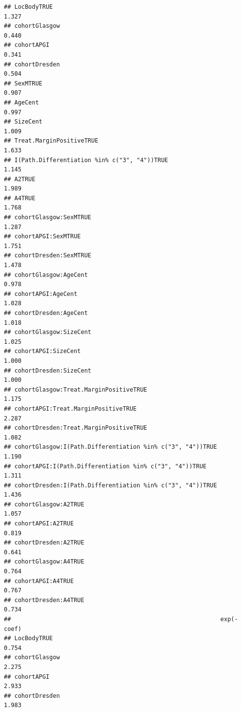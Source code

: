 \documentclass{article}\usepackage[]{graphicx}\usepackage[]{color}
\makeatletter
\newenvironment{kframe}{%
 \def\at@end@of@kframe{}%
 \ifinner\ifhmode%
  \def\at@end@of@kframe{\end{minipage}}%
  \begin{minipage}{\columnwidth}%
 \fi\fi%
 \def\FrameCommand##1{\hskip\@totalleftmargin \hskip-\fboxsep
 \colorbox{shadecolor}{##1}\hskip-\fboxsep
     \hskip-\linewidth \hskip-\@totalleftmargin \hskip\columnwidth}%
 \MakeFramed {\advance\hsize-\width
   \@totalleftmargin\z@ \linewidth\hsize
   \@setminipage}}%
 {\par\unskip\endMakeFramed%
 \at@end@of@kframe}
\newenvironment{knitrout}{}{} %
\makeatother
\begin{document}
\begin{knitrout}
\begin{kframe}
\begin{verbatim}
## LocBodyTRUE                                                    1.327
## cohortGlasgow                                                  0.440
## cohortAPGI                                                     0.341
## cohortDresden                                                  0.504
## SexMTRUE                                                       0.907
## AgeCent                                                        0.997
## SizeCent                                                       1.009
## Treat.MarginPositiveTRUE                                       1.633
## I(Path.Differentiation %in% c("3", "4"))TRUE                   1.145
## A2TRUE                                                         1.989
## A4TRUE                                                         1.768
## cohortGlasgow:SexMTRUE                                         1.287
## cohortAPGI:SexMTRUE                                            1.751
## cohortDresden:SexMTRUE                                         1.478
## cohortGlasgow:AgeCent                                          0.978
## cohortAPGI:AgeCent                                             1.028
## cohortDresden:AgeCent                                          1.018
## cohortGlasgow:SizeCent                                         1.025
## cohortAPGI:SizeCent                                            1.000
## cohortDresden:SizeCent                                         1.000
## cohortGlasgow:Treat.MarginPositiveTRUE                         1.175
## cohortAPGI:Treat.MarginPositiveTRUE                            2.287
## cohortDresden:Treat.MarginPositiveTRUE                         1.082
## cohortGlasgow:I(Path.Differentiation %in% c("3", "4"))TRUE     1.190
## cohortAPGI:I(Path.Differentiation %in% c("3", "4"))TRUE        1.311
## cohortDresden:I(Path.Differentiation %in% c("3", "4"))TRUE     1.436
## cohortGlasgow:A2TRUE                                           1.057
## cohortAPGI:A2TRUE                                              0.819
## cohortDresden:A2TRUE                                           0.641
## cohortGlasgow:A4TRUE                                           0.764
## cohortAPGI:A4TRUE                                              0.767
## cohortDresden:A4TRUE                                           0.734
##                                                            exp(-coef)
## LocBodyTRUE                                                     0.754
## cohortGlasgow                                                   2.275
## cohortAPGI                                                      2.933
## cohortDresden                                                   1.983

\end{verbatim}
\end{kframe}
\end{knitrout}
\end{document}
